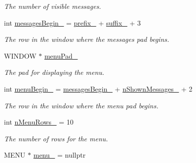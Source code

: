 \begin{DoxyCompactItemize}
\begin{DoxyCompactList}\small\item\em The number of visible messages. \end{DoxyCompactList}\item 
int \hyperlink{structLogWindow_a783d4b13a35766748b60b34edaca796a}{messages\+Begin\+\_\+} = \hyperlink{structLogWindow_a30e6ca2c1b89cbbd8a4d02f041e090be}{prefix\+\_\+} + \hyperlink{structLogWindow_aebb15a8089f81bcaa513d77d9441d9b6}{suffix\+\_\+} + 3\hypertarget{structLogWindow_a783d4b13a35766748b60b34edaca796a}{}\label{structLogWindow_a783d4b13a35766748b60b34edaca796a}

\begin{DoxyCompactList}\small\item\em The row in the window where the messages pad begins. \end{DoxyCompactList}\item 
W\+I\+N\+D\+OW $\ast$ \hyperlink{structLogWindow_a9d87d739d269f252100093e4b9140656}{menu\+Pad\+\_\+}\hypertarget{structLogWindow_a9d87d739d269f252100093e4b9140656}{}\label{structLogWindow_a9d87d739d269f252100093e4b9140656}

\begin{DoxyCompactList}\small\item\em The pad for displaying the menu. \end{DoxyCompactList}\item 
int \hyperlink{structLogWindow_a3e94fc0024b93d3d54b20dd674835322}{menu\+Begin\+\_\+} = \hyperlink{structLogWindow_a783d4b13a35766748b60b34edaca796a}{messages\+Begin\+\_\+} + \hyperlink{structLogWindow_adae9a621e7bd1182b3faabd704fd3518}{n\+Shown\+Messages\+\_\+} + 2\hypertarget{structLogWindow_a3e94fc0024b93d3d54b20dd674835322}{}\label{structLogWindow_a3e94fc0024b93d3d54b20dd674835322}

\begin{DoxyCompactList}\small\item\em The row in the window where the menu pad begins. \end{DoxyCompactList}\item 
int \hyperlink{structLogWindow_a554a902fd7de50efeddb28ae60a0406a}{n\+Menu\+Rows\+\_\+} = 10\hypertarget{structLogWindow_a554a902fd7de50efeddb28ae60a0406a}{}\label{structLogWindow_a554a902fd7de50efeddb28ae60a0406a}

\begin{DoxyCompactList}\small\item\em The number of rows for the menu. \end{DoxyCompactList}\item 
M\+E\+NU $\ast$ \hyperlink{structLogWindow_a60957ec9d92c783b5d047963751dd472}{menu\+\_\+} = nullptr\hypertarget{structLogWindow_a60957ec9d92c783b5d047963751dd472}{}\label{structLogWindow_a60957ec9d92c783b5d047963751dd472}


\end{DoxyCompactItemize}
